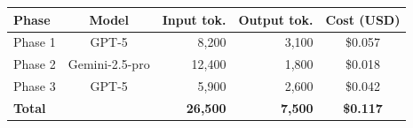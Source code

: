 \begin{tabular}{lcrrc}
\toprule
\textbf{Phase} & \textbf{Model} & \textbf{Input tok.} & \textbf{Output tok.} & \textbf{Cost (USD)} \\
\midrule
Phase 1 & GPT-5 & 8,200 & 3,100 & \$0.057 \\
Phase 2 & Gemini-2.5-pro & 12,400 & 1,800 & \$0.018 \\
Phase 3 & GPT-5 & 5,900 & 2,600 & \$0.042 \\
\midrule
\textbf{Total} & & \textbf{26,500} & \textbf{7,500} & \textbf{\$0.117} \\
\bottomrule
\end{tabular}
